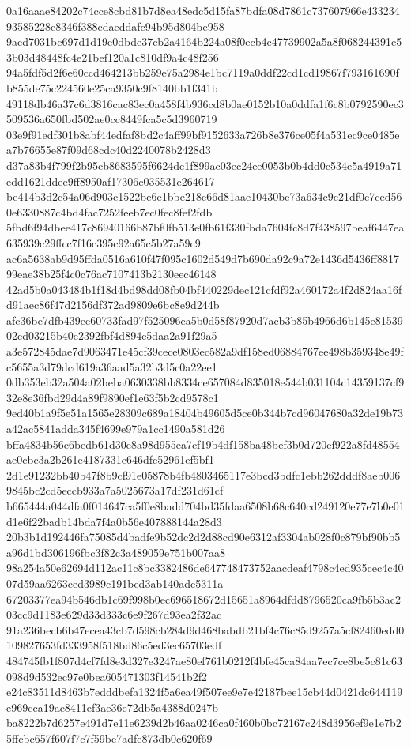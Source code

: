 \documentclass[11pt,a4paper]{article}
\begin{document}
{0a16aaae84202c74cce8cbd81b7d8ea48edc5d15fa87bdfa08d7861c737607966e43323493585228c8346f388cdaeddafc94b95d804be958
9acd7031bc697d1d19e0dbde37cb2a4164b224a08f0ecb4c47739902a5a8f068244391c53b03d48448fc4e21bef120a1c810df9a4c48f256
94a5fdf5d2f6e60ccd464213bb259e75a2984e1bc7119a0ddf22cd1cd19867f793161690fb855de75c224560e25ca9350c9f8140bb1f341b
49118db46a37c6d3816cac83ec0a458f4b936cd8b0ae0152b10a0ddfa1f6c8b0792590ec3509536a650fbd502ae0cc8449fca5c5d3960719
03e9f91edf301b8abf44edfaf8bd2c4aff99bf9152633a726b8e376ce05f4a531ec9ce0485ea7b76655e87f09d68cdc40d2240078b2428d3
d37a83b4f799f2b95cb8683595f6624dc1f899ac03ec24ee0053b0b4dd0c534e5a4919a71edd1621ddee9ff8950af17306c035531e264617
be414b3d2c54a06d903c1522be6e1bbe218e66d81aae10430be73a634c9c21df0c7ced560e6330887c4bd4fac7252feeb7ec0fec8fef2fdb
5fbd6f94dbee417c86940166b87bf0fb513e0fb61f330fbda7604fc8d7f438597beaf6447ea635939c29ffcc7f16c395c92a65c5b27a59c9
ac6a5638ab9d95ffda0516a610f47f095c1602d549d7b690da92c9a72e1436d5436ff881799eae38b25f4c0c76ac7107413b2130eec46148
42ad5b0a043484b1f18d4bd98dd08fb04bf440229dec121cfdf92a460172a4f2d824aa16fd91aec86f47d2156df372ad9809e6bc8e9d244b
afc36be7dfb439ee60733fad97f525096ea5b0d58f87920d7acb3b85b4966d6b145e8153902cd03215b40e2392fbf4d894e5daa2a91f29a5
a3e572845dae7d9063471e45cf39cece0803ec582a9df158ed06884767ee498b359348e49fc5655a3d79dcd619a36aad5a32b3d5c0a22ee1
0db353eb32a504a02beba0630338bb8334ce657084d835018e544b031104c14359137cf932e8e36fbd29d4a89f9890ef1e63f5b2cd9578c1
9ed40b1a9f5e51a1565e28309c689a18404b49605d5ce0b344b7cd96047680a32de19b73a42ac5841adda345f4699e979a1cc1490a581d26
bffa4834b56c6bedb61d30e8a98d955ea7cf19b4df158ba48bef3b0d720ef922a8fd48554ae0cbc3a2b261e4187331e646dfc52961ef5bf1
2d1e91232bb40b47f8b9cf91e05878b4fb4803465117e3bcd3bdfc1ebb262dddf8aeb0069845bc2cd5eccb933a7a5025673a17df231d61cf
b665444a044dfa0f014647ca5f0e8badd704bd35fdaa6508b68c640cd249120e77e7b0e01d1e6f22badb14bda7f4a0b56e407888144a28d3
20b3b1d192446fa75085d4badfe9b52dc2d2d88cd90e6312af3304ab028f0c879bf90bb5a96d1bd306196fbc3f82c3a489059e751b007aa8
98a254a50e62694d112ac11c8bc3382486de647748473752aacdeaf4798c4ed935cec4c4007d59aa6263ced3989c191bed3ab140adc5311a
67203377ea94b546db1c69f998b0ec696518672d15651a8964dfdd8796520ca9fb5b3ac203cc9d1183e629d33d333c6e9f267d93ea2f32ac
91a236becb6b47ecea43cb7d598cb284d9d468babdb21bf4c76c85d9257a5cf82460edd0109827653fd333958f518bd86c5ed3ec65703edf
484745fb1f807d4cf7fd8e3d327e3247ae80ef761b0212f4bfe45ca84aa7ec7ce8be5c81c63098d9d532ec97e0bea605471303f14541b2f2
e24c83511d8463b7edddbefa1324f5a6ea49f507ee9e7e42187bee15cb44d0421dc644119e969cca19ac8411ef3ae36e72db5a4388d0247b
ba8222b7d6257e491d7e11e6239d2b46aa0246ca0f460b0bc72167c248d3956ef9e1e7b25ffcbc657f607f7c7f59be7adfe873db0c620f69
}
\end{document}
